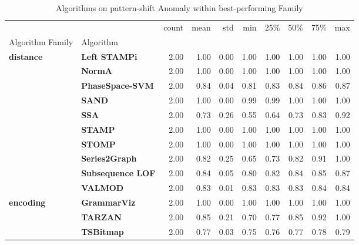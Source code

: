 \begin{table}
\caption{Algorithms on pattern-shift Anomaly within best-performing Family}
\label{tab:bp-pattern-shift}
\begin{tabular}{llrrrrrrrr}
\toprule
 &  & count & mean & std & min & 25\% & 50\% & 75\% & max \\
Algorithm Family & Algorithm &  &  &  &  &  &  &  &  \\
\midrule
\multirow[t]{10}{*}{\textbf{distance}} & \textbf{Left STAMPi} & 2.00 & 1.00 & 0.00 & 1.00 & 1.00 & 1.00 & 1.00 & 1.00 \\
\textbf{} & \textbf{NormA} & 2.00 & 1.00 & 0.00 & 1.00 & 1.00 & 1.00 & 1.00 & 1.00 \\
\textbf{} & \textbf{PhaseSpace-SVM} & 2.00 & 0.84 & 0.04 & 0.81 & 0.83 & 0.84 & 0.86 & 0.87 \\
\textbf{} & \textbf{SAND} & 2.00 & 1.00 & 0.00 & 0.99 & 0.99 & 1.00 & 1.00 & 1.00 \\
\textbf{} & \textbf{SSA} & 2.00 & 0.73 & 0.26 & 0.55 & 0.64 & 0.73 & 0.83 & 0.92 \\
\textbf{} & \textbf{STAMP} & 2.00 & 1.00 & 0.00 & 1.00 & 1.00 & 1.00 & 1.00 & 1.00 \\
\textbf{} & \textbf{STOMP} & 2.00 & 1.00 & 0.00 & 1.00 & 1.00 & 1.00 & 1.00 & 1.00 \\
\textbf{} & \textbf{Series2Graph} & 2.00 & 0.82 & 0.25 & 0.65 & 0.73 & 0.82 & 0.91 & 1.00 \\
\textbf{} & \textbf{Subsequence LOF} & 2.00 & 0.84 & 0.05 & 0.80 & 0.82 & 0.84 & 0.85 & 0.87 \\
\textbf{} & \textbf{VALMOD} & 2.00 & 0.83 & 0.01 & 0.83 & 0.83 & 0.83 & 0.84 & 0.84 \\
\cline{1-10}
\multirow[t]{3}{*}{\textbf{encoding}} & \textbf{GrammarViz} & 2.00 & 1.00 & 0.00 & 1.00 & 1.00 & 1.00 & 1.00 & 1.00 \\
\textbf{} & \textbf{TARZAN} & 2.00 & 0.85 & 0.21 & 0.70 & 0.77 & 0.85 & 0.92 & 1.00 \\
\textbf{} & \textbf{TSBitmap} & 2.00 & 0.77 & 0.03 & 0.75 & 0.76 & 0.77 & 0.78 & 0.79 \\
\cline{1-10}
\bottomrule
\end{tabular}
\end{table}
